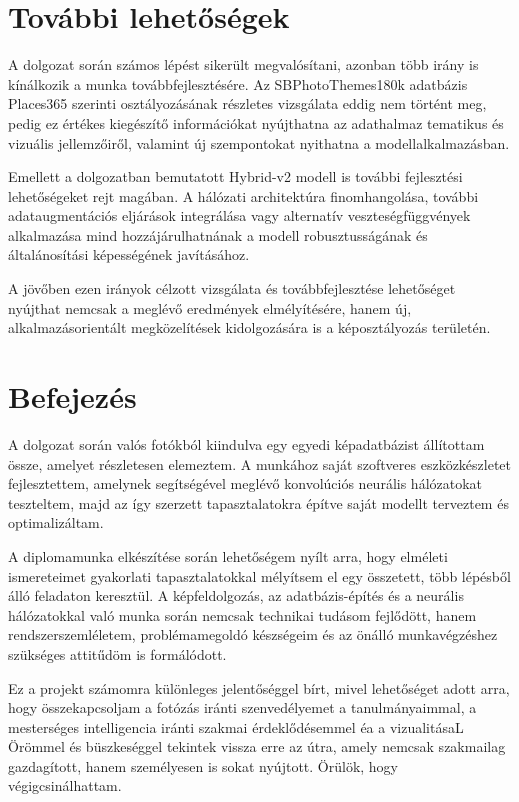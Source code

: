 \chapter{ További lehetőségek}
A dolgozat során számos lépést sikerült megvalósítani, azonban több irány is kínálkozik a munka továbbfejlesztésére. Az SBPhotoThemes180k adatbázis Places365 szerinti osztályozásának részletes vizsgálata eddig nem történt meg, pedig ez értékes kiegészítő információkat nyújthatna az adathalmaz tematikus és vizuális jellemzőiről, valamint új szempontokat nyithatna a modellalkalmazásban.

Emellett a dolgozatban bemutatott Hybrid-v2 modell is további fejlesztési lehetőségeket rejt magában. A hálózati architektúra finomhangolása, további adataugmentációs eljárások integrálása vagy alternatív veszteségfüggvények alkalmazása mind hozzájárulhatnának a modell robusztusságának és általánosítási képességének javításához.

A jövőben ezen irányok célzott vizsgálata és továbbfejlesztése lehetőséget nyújthat nemcsak a meglévő eredmények elmélyítésére, hanem új, alkalmazásorientált megközelítések kidolgozására is a képosztályozás területén.

\chapter{ Befejezés}
A dolgozat során valós fotókból kiindulva egy egyedi képadatbázist állítottam össze, amelyet részletesen elemeztem. A munkához saját szoftveres eszközkészletet fejlesztettem, amelynek segítségével meglévő konvolúciós neurális hálózatokat teszteltem, majd az így szerzett tapasztalatokra építve saját modellt terveztem és optimalizáltam.

A diplomamunka elkészítése során lehetőségem nyílt arra, hogy elméleti ismereteimet gyakorlati tapasztalatokkal mélyítsem el egy összetett, több lépésből álló feladaton keresztül. A képfeldolgozás, az adatbázis-építés és a neurális hálózatokkal való munka során nemcsak technikai tudásom fejlődött, hanem rendszerszemléletem, problémamegoldó készségeim és az önálló munkavégzéshez szükséges attitűdöm is formálódott.

Ez a projekt számomra különleges jelentőséggel bírt, mivel lehetőséget adott arra, hogy összekapcsoljam a fotózás iránti szenvedélyemet a tanulmányaimmal, a mesterséges intelligencia iránti szakmai érdeklődésemmel éa a vizualitásaL \\
Örömmel és büszkeséggel tekintek vissza erre az útra, amely nemcsak szakmailag gazdagított, hanem személyesen is sokat nyújtott. Örülök, hogy végigcsinálhattam.
